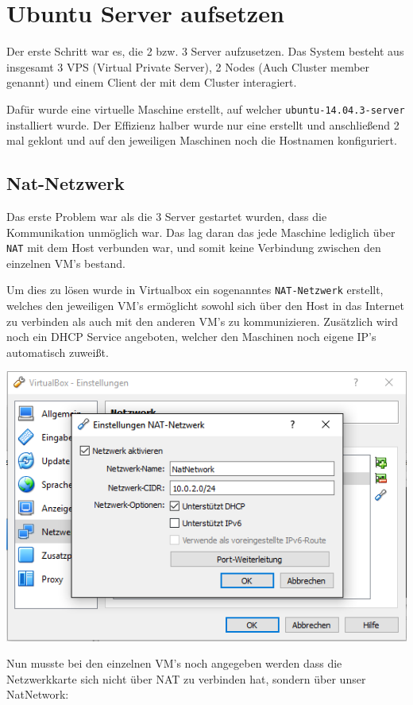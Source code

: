 
\section{Ubuntu Server aufsetzen}
Der erste Schritt war es, die 2 bzw. 3 Server aufzusetzen. Das System besteht aus insgesamt 3 VPS (Virtual Private Server), 2 Nodes (Auch Cluster member genannt) und einem Client der mit dem Cluster interagiert. 

Dafür wurde eine virtuelle Maschine erstellt, auf welcher \verb|ubuntu-14.04.3-server| installiert wurde.
Der Effizienz halber wurde nur eine erstellt und anschließend 2 mal geklont und auf den jeweiligen Maschinen noch die Hostnamen konfiguriert.

\subsection{Nat-Netzwerk}
Das erste Problem war als die 3 Server gestartet wurden, dass die Kommunikation unmöglich war. Das lag daran das jede Maschine lediglich über \verb|NAT| mit dem Host verbunden war, und somit keine Verbindung zwischen den einzelnen VM's bestand.

Um dies zu lösen wurde in Virtualbox ein sogenanntes \verb|NAT-Netzwerk| erstellt, welches den jeweiligen VM's ermöglicht sowohl sich über den Host in das Internet zu verbinden als auch mit den anderen VM's zu kommunizieren. Zusätzlich wird noch ein DHCP Service angeboten, welcher den Maschinen noch eigene IP's automatisch zuweißt. 

\begin{minipage}{\linewidth}
	\centering
	\includegraphics[width=0.53\linewidth]{images/natnetwork}
\end{minipage}

Nun musste bei den einzelnen VM's noch angegeben werden dass die Netzwerkkarte sich nicht über NAT zu verbinden hat, sondern über unser NatNetwork:

